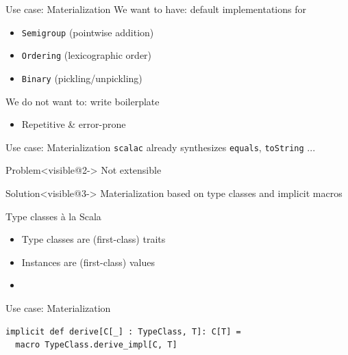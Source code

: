 \documentclass{beamer}
\begin{document}
\begin{frame}{Use case: Materialization}
  We want to have: default implementations for
  \begin{itemize}
    \item \texttt{Semigroup} (pointwise addition)
    \item \texttt{Ordering} (lexicographic order)
    \item \texttt{Binary} (pickling/unpickling)
  \end{itemize}

  \vspace{1em}
  We do not want to: write boilerplate
  \begin{itemize}
    \item Repetitive \& error-prone
  \end{itemize}
\end{frame}

\begin{frame}{Use case: Materialization}
  \texttt{scalac} already synthesizes \texttt{equals}, \texttt{toString} ...

  \vspace{1em}
  \begin{alertblock}{Problem}<visible@2->
    Not extensible
  \end{alertblock}

  \vspace{1em}
  \begin{exampleblock}{Solution}<visible@3->
    Materialization based on type classes and implicit macros
  \end{exampleblock}
\end{frame}

\begin{frame}{Type classes \`a la Scala}
  \begin{itemize}
    \item Type classes are (first-class) traits
    \item Instances are (first-class) values
    \item<visible@2> \text{\color{blue}{Both can use arbitrary language features}}
  \end{itemize}
\end{frame}

\begin{frame}[fragile]{Use case: Materialization}
  \begin{verbatim}
implicit def derive[C[_] : TypeClass, T]: C[T] =
  macro TypeClass.derive_impl[C, T]
  \end{verbatim}
\end{frame}
\end{document}
